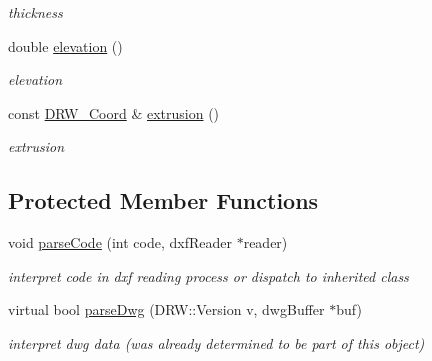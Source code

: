 \begin{DoxyCompactItemize}
\begin{DoxyCompactList}\small\item\em thickness \end{DoxyCompactList}\item 
\hypertarget{class_d_r_w___solid_a38342cb41e9b3aeae1fe4f709c2558e8}{}double \hyperlink{class_d_r_w___solid_a38342cb41e9b3aeae1fe4f709c2558e8}{elevation} ()\label{class_d_r_w___solid_a38342cb41e9b3aeae1fe4f709c2558e8}

\begin{DoxyCompactList}\small\item\em elevation \end{DoxyCompactList}\item 
\hypertarget{class_d_r_w___solid_aaff3bcd0e5bb8927bc4748acc23019a4}{}const \hyperlink{class_d_r_w___coord}{D\+R\+W\+\_\+\+Coord} \& \hyperlink{class_d_r_w___solid_aaff3bcd0e5bb8927bc4748acc23019a4}{extrusion} ()\label{class_d_r_w___solid_aaff3bcd0e5bb8927bc4748acc23019a4}

\begin{DoxyCompactList}\small\item\em extrusion \end{DoxyCompactList}\end{DoxyCompactItemize}
\subsection*{Protected Member Functions}
\begin{DoxyCompactItemize}
\item 
\hypertarget{class_d_r_w___solid_a6afdf664e6245381382d2646d52d0638}{}void \hyperlink{class_d_r_w___solid_a6afdf664e6245381382d2646d52d0638}{parse\+Code} (int code, dxf\+Reader $\ast$reader)\label{class_d_r_w___solid_a6afdf664e6245381382d2646d52d0638}

\begin{DoxyCompactList}\small\item\em interpret code in dxf reading process or dispatch to inherited class \end{DoxyCompactList}\item 
\hypertarget{class_d_r_w___solid_a7d87f532461cd372336ba8d16976b0f4}{}virtual bool \hyperlink{class_d_r_w___solid_a7d87f532461cd372336ba8d16976b0f4}{parse\+Dwg} (D\+R\+W\+::\+Version v, dwg\+Buffer $\ast$buf)\label{class_d_r_w___solid_a7d87f532461cd372336ba8d16976b0f4}

\begin{DoxyCompactList}\small\item\em interpret dwg data (was already determined to be part of this object) \end{DoxyCompactList}\end{DoxyCompactItemize}

